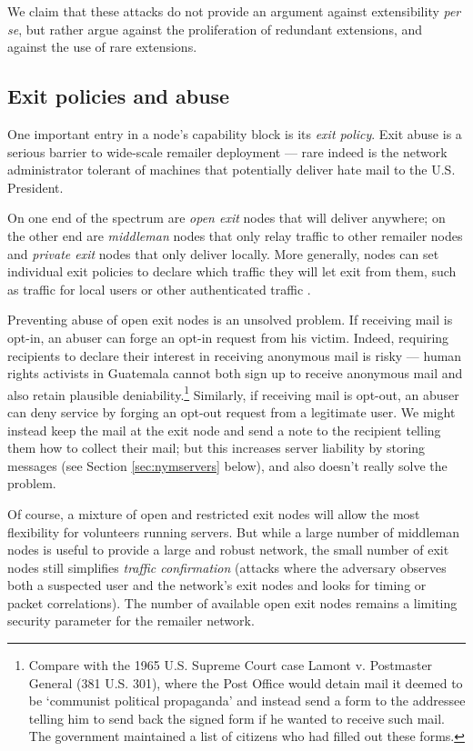 \documentclass{llncs}
\begin{document}
We claim that these attacks do not provide an argument against
extensibility \emph{per se}, but rather argue against the proliferation
of redundant extensions, and against the use of rare extensions.  

\subsection{Exit policies and abuse}
\label{subsec:exitpolicies}

One important entry in a node's capability block is its \emph{exit
policy}. Exit abuse is a serious barrier to wide-scale remailer deployment
--- rare indeed is the network administrator tolerant of machines that
potentially deliver hate mail to the U.S. President.

On one end of the spectrum are \emph{open exit} nodes that will
deliver anywhere; on the other end are \emph{middleman} nodes that
only relay traffic to other remailer nodes and \emph{private exit}
nodes that only deliver locally. More generally, nodes can set
individual exit policies to declare which traffic they will let exit
from them, such as traffic for local users or other authenticated
traffic \cite{onion-discex00}.

Preventing abuse of open exit nodes is an unsolved problem. If
receiving mail is opt-in, an abuser can forge an opt-in request from
his victim. Indeed, requiring recipients to declare their interest
in receiving anonymous mail is risky --- human rights activists in
Guatemala cannot both sign up to receive anonymous mail and also retain
plausible deniability.\footnote{
  Compare with the 1965 U.S. Supreme Court case Lamont v. Postmaster
  General (381 U.S. 301), where the Post Office would detain mail it
  deemed to be `communist political propaganda' and instead send a form
  to the addressee telling him to send back the signed form if he wanted
  to receive such mail. The government maintained a list of citizens
  who had filled out these forms.
} Similarly, if receiving mail is opt-out, an abuser can deny service
by forging an opt-out request from a legitimate user. We might instead
keep the mail at the exit node and send a note to the recipient
telling them how to collect their mail; but this increases
server liability by storing messages (see Section \ref{sec:nymservers}
below), and also doesn't really solve the problem.

Of course, a mixture of open and restricted exit nodes will allow the
most flexibility for volunteers running servers. But while a large number
of middleman nodes is useful to provide a large and robust network, the
small number of exit nodes still simplifies \emph{traffic confirmation}
(attacks where the adversary observes both a suspected user and the
network's exit nodes and looks for timing or packet correlations). The
number of available open exit nodes remains a limiting security parameter
for the remailer network.
\end{document}
